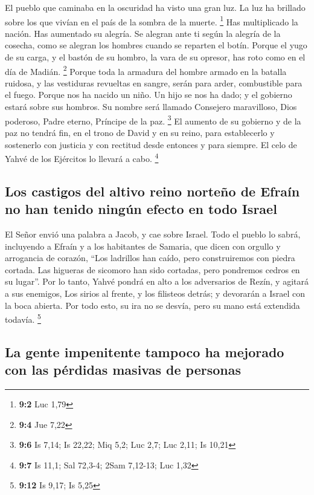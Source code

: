  El pueblo que caminaba en la oscuridad ha visto una gran
luz. La luz ha brillado sobre los que vivían en el país de la sombra de
la muerte. \footnote{\textbf{9:2} Luc 1,79}  Has
multiplicado la nación. Has aumentado su alegría. Se alegran ante ti
según la alegría de la cosecha, como se alegran los hombres cuando se
reparten el botín.  Porque el yugo de su carga, y el
bastón de su hombro, la vara de su opresor, has roto como en el día de
Madián. \footnote{\textbf{9:4} Jue 7,22}  Porque toda la
armadura del hombre armado en la batalla ruidosa, y las vestiduras
revueltas en sangre, serán para arder, combustible para el fuego.
 Porque nos ha nacido un niño. Un hijo se nos ha dado; y
el gobierno estará sobre sus hombros. Su nombre será llamado Consejero
maravilloso, Dios poderoso, Padre eterno, Príncipe de la paz.
\footnote{\textbf{9:6} Is 7,14; Is 22,22; Miq 5,2; Luc 2,7; Luc 2,11; Is
  10,21}  El aumento de su gobierno y de la paz no tendrá
fin, en el trono de David y en su reino, para establecerlo y sostenerlo
con justicia y con rectitud desde entonces y para siempre. El celo de
Yahvé de los Ejércitos lo llevará a cabo. \footnote{\textbf{9:7} Is
  11,1; Sal 72,3-4; 2Sam 7,12-13; Luc 1,32}

\hypertarget{los-castigos-del-altivo-reino-norteuxf1o-de-efrauxedn-no-han-tenido-ninguxfan-efecto-en-todo-israel}{%
\subsection{Los castigos del altivo reino norteño de Efraín no han
tenido ningún efecto en todo
Israel}\label{los-castigos-del-altivo-reino-norteuxf1o-de-efrauxedn-no-han-tenido-ninguxfan-efecto-en-todo-israel}}

 El Señor envió una palabra a Jacob, y cae sobre Israel.
 Todo el pueblo lo sabrá, incluyendo a Efraín y a los
habitantes de Samaria, que dicen con orgullo y arrogancia de corazón,
 ``Los ladrillos han caído, pero construiremos con piedra
cortada. Las higueras de sicomoro han sido cortadas, pero pondremos
cedros en su lugar''.  Por lo tanto, Yahvé pondrá en alto
a los adversarios de Rezín, y agitará a sus enemigos, 
Los sirios al frente, y los filisteos detrás; y devorarán a Israel con
la boca abierta. Por todo esto, su ira no se desvía, pero su mano está
extendida todavía. \footnote{\textbf{9:12} Is 9,17; Is 5,25}

\hypertarget{la-gente-impenitente-tampoco-ha-mejorado-con-las-puxe9rdidas-masivas-de-personas}{%
\subsection{La gente impenitente tampoco ha mejorado con las pérdidas
masivas de
personas}\label{la-gente-impenitente-tampoco-ha-mejorado-con-las-puxe9rdidas-masivas-de-personas}}

